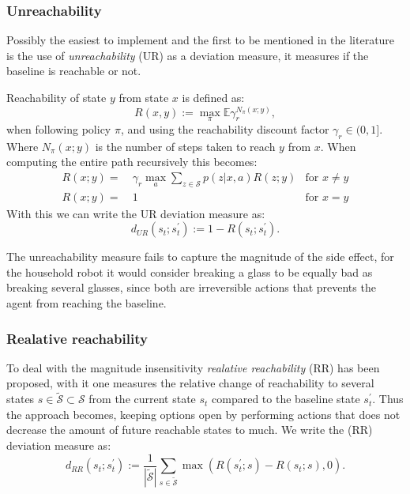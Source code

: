 \documentclass[12pt,A4]{report}
\theoremstyle{definition}
\begin{document}
\subsubsection{Unreachability}
Possibly the easiest to implement and the first to be mentioned in the literature is the use of \textit{unreachability} (UR) as a deviation measure, it measures if the baseline is reachable or not. 

Reachability of state $y$ from state $x$ is defined as:
\[ R(x, y) := \max_\pi\mathbb{E}\gamma_r^{N_\pi(x;y)},\]
when following policy $\pi$, and using the reachability discount factor $\gamma_r \in (0, 1]$. Where $N_\pi(x;y)$ is the number of steps taken to reach $y$ from $x$. When computing the entire path recursively this becomes:
\begin{align*}
  R(x;y) =& \ \gamma_r \max_a \sum_{z \in \mathcal{S}}p(z|x,a)R(z;y) & \text{for } x \neq y\\
  R(x;y) =& \ 1 & \text{for } x = y
\end{align*}
With this we can write the UR deviation measure as:
\[ d_{UR}(s_t;s_t^\prime) := 1 - R(s_t;s_t^\prime).\]

The unreachability measure fails to capture the magnitude of the side effect, for the household robot it would consider breaking a glass to be equally bad as breaking several glasses, since both are irreversible actions that prevents the agent from reaching the baseline.  


\subsubsection{Realative reachability}
To deal with the magnitude insensitivity \textit{realative reachability} (RR) has been proposed, with it one measures the relative change of reachability to several states $s \in \tilde{\mathcal{S}} \subset \mathcal{S}$ from the current state $s_t$ compared to the baseline state $s_t^\prime$. Thus the approach becomes, keeping options open by performing actions that does not decrease the amount of future reachable states to much. We write the (RR) deviation measure as:
\[d_{RR}(s_t;s^{\prime}_t) := \frac{1}{|\tilde{\mathcal{S}}|}\sum_{s\in\tilde{\mathcal{S}}} \max (R(s^{\prime}_t;s) - R(s_t;s), 0).\]
\end{document}
